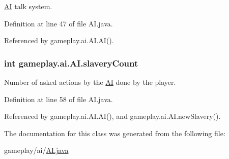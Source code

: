\hyperlink{a00001}{A\-I} talk system. 



Definition at line 47 of file A\-I.\-java.



Referenced by gameplay.\-ai.\-A\-I.\-A\-I().

\hypertarget{a00001_a891607c5493095d3c5e7988b401b769c}{
\subsubsection[{slavery\-Count}]{\setlength{\rightskip}{0pt plus 5cm}int gameplay.\-ai.\-A\-I.\-slavery\-Count\hspace{0.3cm}{\ttfamily [protected]}}}\label{a00001_a891607c5493095d3c5e7988b401b769c}


Number of asked actions by the \hyperlink{a00001}{A\-I} done by the player. 



Definition at line 58 of file A\-I.\-java.



Referenced by gameplay.\-ai.\-A\-I.\-A\-I(), and gameplay.\-ai.\-A\-I.\-new\-Slavery().



The documentation for this class was generated from the following file\-:\begin{DoxyCompactItemize}
\item 
gameplay/ai/\hyperlink{a00043}{A\-I.\-java}\end{DoxyCompactItemize}
